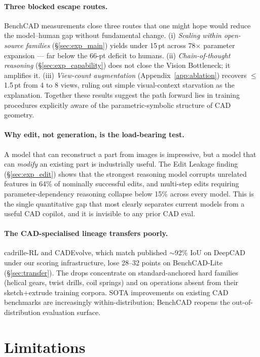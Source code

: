 \documentclass{article}
\begin{document}
\paragraph{Three blocked escape routes.} BenchCAD measurements close three routes that one might hope would reduce the model--human gap without fundamental change. (i) \emph{Scaling within open-source families} (\S\ref{sec:exp_main}) yields under 15\,pt across 78$\times$ parameter expansion --- far below the 66-pt deficit to humans. (ii) \emph{Chain-of-thought reasoning} (\S\ref{sec:exp_capability}) does not close the Vision Bottleneck; it amplifies it. (iii) \emph{View-count augmentation} (Appendix~\ref{app:ablation}) recovers $\leq$1.5\,pt from 4 to 8 views, ruling out simple visual-context starvation as the explanation. Together these results suggest the path forward lies in training procedures explicitly aware of the parametric-symbolic structure of CAD geometry.

\paragraph{Why edit, not generation, is the load-bearing test.} A model that can reconstruct a part from images is impressive, but a model that can \emph{modify} an existing part is industrially useful. The Edit Leakage finding (\S\ref{sec:exp_edit}) shows that the strongest reasoning model corrupts unrelated features in 64\% of nominally successful edits, and multi-step edits requiring parameter-dependency reasoning collapse below 15\% across every model. This is the single quantitative gap that most clearly separates current models from a useful CAD copilot, and it is invisible to any prior CAD eval.

\paragraph{The CAD-specialised lineage transfers poorly.} cadrille-RL and CADEvolve, which match published $\sim$92\% IoU on DeepCAD under our scoring infrastructure, lose 28--32 points on BenchCAD-Lite (\S\ref{sec:transfer}). The drops concentrate on standard-anchored hard families (helical gears, twist drills, coil springs) and on operations absent from their sketch+extrude training corpora. SOTA improvements on existing CAD benchmarks are increasingly within-distribution; BenchCAD reopens the out-of-distribution evaluation surface.

\section{Limitations}
\label{sec:limitations}
\end{document}
